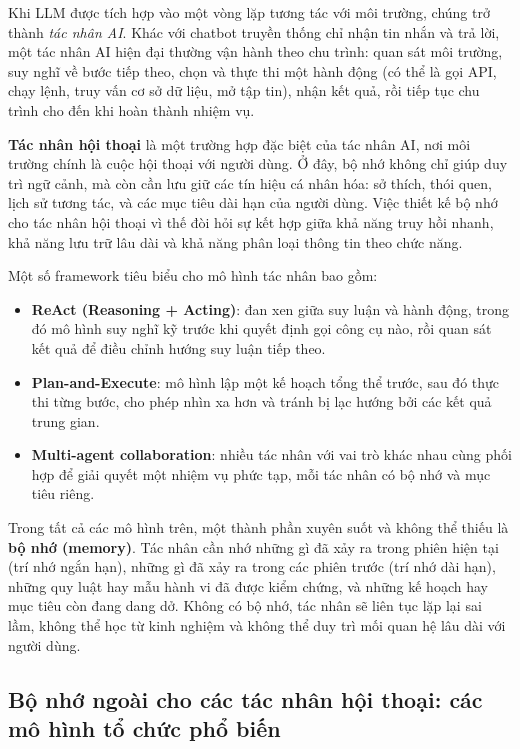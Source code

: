 \documentclass[../main.tex]{subfiles}
\begin{document}
Khi LLM được tích hợp vào một vòng lặp tương tác với môi trường, chúng trở thành \textit{tác nhân AI}. Khác với chatbot truyền thống chỉ nhận tin nhắn và trả lời, một tác nhân AI hiện đại thường vận hành theo chu trình: quan sát môi trường, suy nghĩ về bước tiếp theo, chọn và thực thi một hành động (có thể là gọi API, chạy lệnh, truy vấn cơ sở dữ liệu, mở tập tin), nhận kết quả, rồi tiếp tục chu trình cho đến khi hoàn thành nhiệm vụ.

\textbf{Tác nhân hội thoại} là một trường hợp đặc biệt của tác nhân AI, nơi môi trường chính là cuộc hội thoại với người dùng. Ở đây, bộ nhớ không chỉ giúp duy trì ngữ cảnh, mà còn cần lưu giữ các tín hiệu cá nhân hóa: sở thích, thói quen, lịch sử tương tác, và các mục tiêu dài hạn của người dùng. Việc thiết kế bộ nhớ cho tác nhân hội thoại vì thế đòi hỏi sự kết hợp giữa khả năng truy hồi nhanh, khả năng lưu trữ lâu dài và khả năng phân loại thông tin theo chức năng.

Một số framework tiêu biểu cho mô hình tác nhân bao gồm:

\begin{itemize}
    \item \textbf{ReAct (Reasoning + Acting)}: đan xen giữa suy luận và hành động, trong đó mô hình suy nghĩ kỹ trước khi quyết định gọi công cụ nào, rồi quan sát kết quả để điều chỉnh hướng suy luận tiếp theo.
    \item \textbf{Plan-and-Execute}: mô hình lập một kế hoạch tổng thể trước, sau đó thực thi từng bước, cho phép nhìn xa hơn và tránh bị lạc hướng bởi các kết quả trung gian.
    \item \textbf{Multi-agent collaboration}: nhiều tác nhân với vai trò khác nhau cùng phối hợp để giải quyết một nhiệm vụ phức tạp, mỗi tác nhân có bộ nhớ và mục tiêu riêng.
\end{itemize}

Trong tất cả các mô hình trên, một thành phần xuyên suốt và không thể thiếu là \textbf{bộ nhớ (memory)}. Tác nhân cần nhớ những gì đã xảy ra trong phiên hiện tại (trí nhớ ngắn hạn), những gì đã xảy ra trong các phiên trước (trí nhớ dài hạn), những quy luật hay mẫu hành vi đã được kiểm chứng, và những kế hoạch hay mục tiêu còn đang dang dở. Không có bộ nhớ, tác nhân sẽ liên tục lặp lại sai lầm, không thể học từ kinh nghiệm và không thể duy trì mối quan hệ lâu dài với người dùng.

\subsection{Bộ nhớ ngoài cho các tác nhân hội thoại: các mô hình tổ chức phổ biến}
\end{document}
